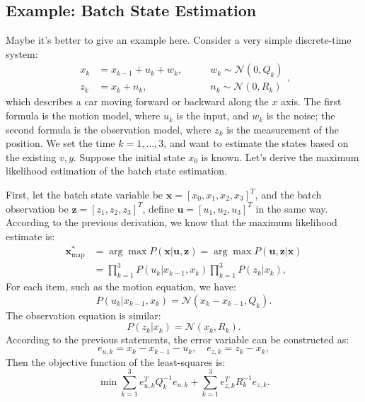 \subsection{Example: Batch State Estimation}
Maybe it's better to give an example here. Consider a very simple discrete-time system:
\begin{equation}
    \begin{array}{lll}
        {x_k} &= {x_{k-1}} + {u_k} + {w_k},&\qquad w_k \sim \mathcal{N}\left( {0,Q_k} \right)\\
        {z_k} &= {x_k} + {n_k},&\qquad {n_k}\sim \mathcal{N}\left( {0,R_k} \right)
    \end{array},
\end{equation}
which describes a car moving forward or backward along the $x$ axis. The first formula is the motion model, where $u_k$ is the input, and $w_k$ is the noise; the second formula is the observation model, where $z_k$ is the measurement of the position. We set the time $k=1,\ldots,3$, and want to estimate the states based on the existing $v,y$. Suppose the initial state $x_0$ is known. Let's derive the maximum likelihood estimation of the batch state estimation.

First, let the batch state variable be $\mathbf{x} = [x_0,x_1, x_2, x_3]^T$, and the batch observation be $\mathbf{z} = [z_1,z_2,z_3]^T$, define $\mathbf{u}=[u_1,u_2,u_3]^T$ in the same way. According to the previous derivation, we know that the maximum likelihood estimate is:
\begin{equation}
    \begin{aligned}
        {\mathbf{x}_{\mathrm{map}}^*} &= \arg \max P(\mathbf{x}|\mathbf{u},\mathbf{z}) = \arg \max P( \mathbf{u},\mathbf{z}|\mathbf{x})\\
        &= \prod\limits_{k = 1}^3 {P({u_k}|{x_{k-1}},{x_k})\prod\limits_{k = 1}^3 {P\left( { {z_k}|{x_k}} \right)} },
    \end{aligned}
\end{equation}
For each item, such as the motion equation, we have:
\begin{equation}
    P({u_k}|{x_{k-1}},{x_k}) = \mathcal{N}({x_k}-{x_{k-1}},{Q_k}).
\end{equation}
The observation equation is similar:
\begin{equation}
    P\left( {{z_k}|{x_k}} \right) = \mathcal{N}\left( {{x_k},{R_k}} \right).
\end{equation}
According to the previous statements, the error variable can be constructed as:
\begin{equation}
    {e_{u,k}} = {x_k}-{x_{k-1}}-{u_k}, \quad {e_{z,k}} = {z_k}-{x_k},
\end{equation}
Then the objective function of the least-squares is:
\begin{equation}
    \min \sum\limits_{k = 1}^3 {e_{u,k}^T Q_k^{-1}{e_{u,k}}} + \sum\limits_{k = 1 }^3 {e_{z,k}^T{R^{-1}_k}{e_{z,k}}}.
\end{equation}

